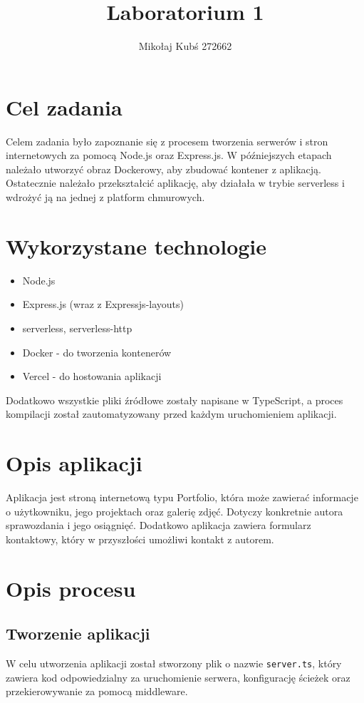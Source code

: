 \documentclass[a4paper,12pt]{article}
\title{Laboratorium 1}
\author{Mikołaj Kubś 272662}
\date{}
\begin{document}
\maketitle

\section{Cel zadania}
Celem zadania było zapoznanie się z procesem tworzenia serwerów i stron internetowych za pomocą Node.js oraz Express.js. W późniejszych etapach należało utworzyć obraz Dockerowy, aby zbudować kontener z aplikacją. Ostatecznie należało przekształcić aplikację, aby działała w trybie serverless i wdrożyć ją na jednej z platform chmurowych.

\section{Wykorzystane technologie}
\begin{itemize}
    \item Node.js
    \item Express.js (wraz z Expressjs-layouts)
    \item serverless, serverless-http
    \item Docker - do tworzenia kontenerów
    \item Vercel - do hostowania aplikacji
\end{itemize}

Dodatkowo wszystkie pliki źródłowe zostały napisane w TypeScript, a proces kompilacji został zautomatyzowany przed każdym uruchomieniem aplikacji.

\section{Opis aplikacji}
Aplikacja jest stroną internetową typu Portfolio, która może zawierać informacje o użytkowniku, jego projektach oraz galerię zdjęć. Dotyczy konkretnie autora sprawozdania i jego osiągnięć. Dodatkowo aplikacja zawiera formularz kontaktowy, który w przyszłości umożliwi kontakt z autorem.

\section{Opis procesu}
\subsection{Tworzenie aplikacji}
W celu utworzenia aplikacji został stworzony plik o nazwie \texttt{server.ts}, który zawiera kod odpowiedzialny za uruchomienie serwera, konfigurację ścieżek oraz przekierowywanie za pomocą middleware.
\end{document}
